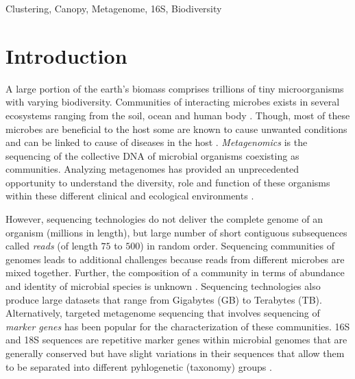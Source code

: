 \documentclass[10pt, conference, compsocconf]{IEEEtran}
\begin{document}
\begin{IEEEkeywords}
Clustering, Canopy, Metagenome, 16S, Biodiversity 
\end{IEEEkeywords}

%
\IEEEpeerreviewmaketitle

\section{Introduction}
\label{intro}


A large portion of the  earth's biomass 
comprises trillions of tiny  microorganisms 
with varying  biodiversity.  Communities
of interacting microbes  exists in several 
ecosystems ranging from the soil, ocean 
and human body \cite{MARHumanMicro}. Though, most of 
these microbes 
are beneficial to the host some are known to cause 
unwanted conditions and can be linked to cause of 
diseases in the host \cite{MARTurnbaugh}. 
%
\emph{Metagenomics} is the 
sequencing of the collective DNA  of 
microbial organisms coexisting as communities. Analyzing 
metagenomes has provided an unprecedented 
opportunity to understand the diversity, role and 
function of these organisms within these 
different 
clinical and ecological environments \cite{MARHumanGut}\cite{MARMihaiPop}.


However, sequencing technologies do not deliver the 
complete genome of an organism (millions in length), but 
large number of short contiguous 
subsequences called \emph{reads} (of length $75$ to $500$) in 
random order. Sequencing communities of genomes 
leads to additional challenges because reads 
from different microbes are mixed together. Further, 
the composition of a community in terms of 
abundance and identity of microbial species
is unknown \cite{MARMetaChallenge}. Sequencing technologies also 
produce large 
datasets that range from Gigabytes (GB) to Terabytes (TB).  Alternatively, 
targeted metagenome sequencing  that 
involves sequencing of \emph{marker genes} has been 
popular for the characterization of these communities. 16S and 18S 
sequences are repetitive marker genes within microbial genomes that 
are generally conserved but 
have slight 
variations in their sequences 
that allow them to be separated into different 
pyhlogenetic (taxonomy) groups \cite{MAR16S}. 
\end{document}
